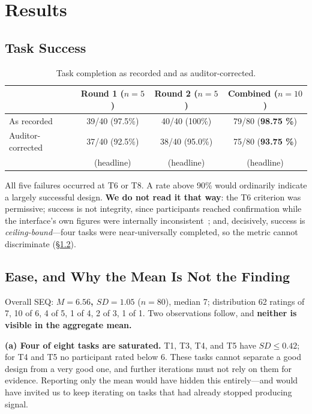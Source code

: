 \documentclass[conference]{IEEEtran}
\begin{document}
\section{Results}
\label{sec:results}

\subsection{Task Success}
\label{sec:success}

\begin{table}[!t]
\caption{Task completion as recorded and as auditor-corrected.}
\label{tab:success}
\centering
\footnotesize
\setlength{\tabcolsep}{4pt}
\begin{tabular}{@{}lccc@{}}
\toprule
 & Round 1 ($n{=}5$) & Round 2 ($n{=}5$) & Combined ($n{=}10$) \\
\midrule
As recorded       & 39/40 (97.5\%) & 40/40 (100\%) & 79/80 (\textbf{98.75 \%}) \\
Auditor-corrected & 37/40 (92.5\%) & 38/40 (95.0\%) & 75/80 (\textbf{93.75 \%}) \\
 & (headline) & (headline) & (headline) \\
\bottomrule
\end{tabular}
\end{table}

All five failures occurred at T6 or T8. A rate above 90\% would ordinarily
indicate a largely successful design. \textbf{We do not read it that
way}: the T6 criterion was permissive; success is not integrity, since
participants reached confirmation while the interface's own figures were
internally inconsistent~\cite{braniwati}; and, decisively, success is
\emph{ceiling-bound}---four tasks were near-universally completed, so the
metric cannot discriminate (\S\ref{sec:ease}).

\subsection{Ease, and Why the Mean Is Not the Finding}
\label{sec:ease}

Overall SEQ: \textbf{$M=6.56$, $SD=1.05$} ($n=80$), median 7; distribution
62 ratings of 7, 10 of 6, 4 of 5, 1 of 4, 2 of 3, 1 of 1. Two observations
follow, and \textbf{neither is visible in the aggregate mean.}

\textbf{(a) Four of eight tasks are saturated.} T1, T3, T4, and T5 have
$SD\leq0.42$; for T4 and T5 no participant rated below 6. These tasks
cannot separate a good design from a very good one, and further iterations
must not rely on them for evidence. Reporting only the mean would have
hidden this entirely---and would have invited us to keep iterating on tasks
that had already stopped producing signal.
\end{document}
